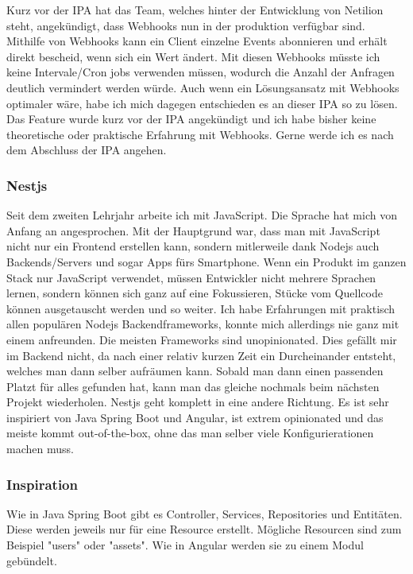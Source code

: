\newline
\newline
Kurz vor der IPA hat das Team, welches hinter der Entwicklung von Netilion steht, angekündigt, dass Webhooks nun in der produktion verfügbar sind. Mithilfe von Webhooks kann ein Client einzelne Events abonnieren und erhält direkt bescheid, wenn sich ein Wert ändert. Mit diesen Webhooks müsste ich keine Intervale/Cron jobs verwenden müssen, wodurch die Anzahl der Anfragen deutlich vermindert werden würde.
\newline
Auch wenn ein Lösungsansatz mit Webhooks optimaler wäre, habe ich mich dagegen entschieden es an dieser IPA so zu lösen. Das Feature wurde kurz vor der IPA angekündigt und ich habe bisher keine theoretische oder praktische Erfahrung mit Webhooks. Gerne werde ich es nach dem Abschluss der IPA angehen.
\subsubsection{Nestjs}
Seit dem zweiten Lehrjahr arbeite ich mit JavaScript. Die Sprache hat mich von Anfang an angesprochen. Mit der Hauptgrund war, dass man mit JavaScript nicht nur ein Frontend erstellen kann, sondern mitlerweile dank Nodejs auch Backends/Servers und sogar Apps fürs Smartphone. Wenn ein Produkt im ganzen Stack nur JavaScript verwendet, müssen Entwickler nicht mehrere Sprachen lernen, sondern können sich ganz auf eine Fokussieren, Stücke vom Quellcode können ausgetauscht werden und so weiter.
\newline
Ich habe Erfahrungen mit praktisch allen populären Nodejs Backendframeworks, konnte mich allerdings nie ganz mit einem anfreunden. Die meisten Frameworks sind unopinionated. Dies gefällt mir im Backend nicht, da nach einer relativ kurzen Zeit ein Durcheinander entsteht, welches man dann selber aufräumen kann. Sobald man dann einen passenden Platzt für alles gefunden hat, kann man das gleiche nochmals beim nächsten Projekt wiederholen.
\newline
Nestjs geht komplett in eine andere Richtung. Es ist sehr inspiriert von Java Spring Boot und Angular, ist extrem opinionated und das meiste kommt out-of-the-box, ohne das man selber viele Konfigurierationen machen muss.
\subsubsection{Inspiration}
Wie in Java Spring Boot gibt es Controller, Services, Repositories und Entitäten. Diese werden jeweils nur für eine Resource erstellt. Mögliche Resourcen sind zum Beispiel "users" oder "assets". Wie in Angular werden sie zu einem Modul gebündelt.
